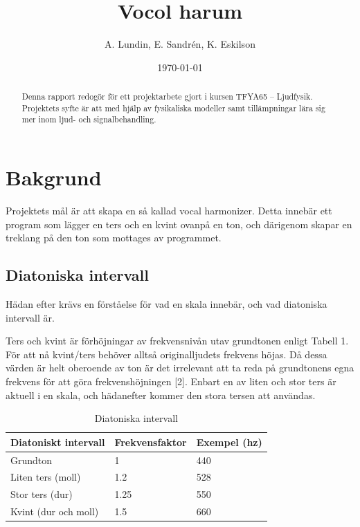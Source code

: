 \documentclass[12pt,a4paper]{article}
\begin{document}
\title{Vocol harum}
\author{A. Lundin, E. Sandrén, K. Eskilson}
\date{\today}



\newpage\null\thispagestyle{empty}\newpage

\newpage{}%

\renewcommand{\abstractname}{Sammanfattning}
\begin{abstract}
  Denna rapport redogör för ett projektarbete gjort i kursen TFYA65 – Ljudfysik. Projektets syfte är att med hjälp av fysikaliska modeller samt tillämpningar lära sig mer inom ljud- och signalbehandling.
\end{abstract}

\newpage

\tableofcontents

\newpage

\section{Bakgrund}

Projektets mål är att skapa en så kallad vocal harmonizer. Detta innebär ett program som lägger en ters och en kvint ovanpå en ton, och därigenom skapar en treklang på den ton som mottages av programmet.

\subsection{Diatoniska intervall}

Hädan efter krävs en förståelse för vad en skala innebär, och vad diatoniska intervall är.

Ters och kvint är förhöjningar av frekvensnivån utav grundtonen enligt Tabell 1. För att nå kvint/ters behöver alltså originalljudets frekvens höjas. Då dessa värden är helt oberoende av ton är det irrelevant att ta reda på grundtonens egna frekvens för att göra frekvenshöjningen [2]. Enbart en av liten och stor ters är aktuell i en skala, och hädanefter kommer den stora tersen att användas. \\

\begin{table}[h]
  \begin{center}
    \begin{tabular}{l l l}
      Diatoniskt intervall & Frekvensfaktor & Exempel (hz) \\
      \hline
      Grundton & 1 & 440 \\
      Liten ters (moll) & 1.2 & 528 \\
      Stor ters (dur) & 1.25 & 550 \\
      Kvint (dur och moll) & 1.5 & 660 \\
    \end{tabular}
    \caption[Table caption text]{Diatoniska intervall}
    \label{table:diatonic}
  \end{center}
\end{table}
\end{document}
